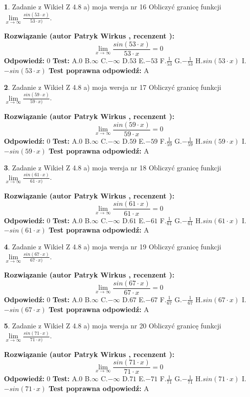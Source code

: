 \documentclass[12pt, a4paper]{article}
\theoremstyle{definition} %
\newtheorem{zad}{}
\newcommand{\zadStart}[1]{\begin{zad}#1\newline}
\newcommand{\zadStop}{\end{zad}}
\newcommand{\rozwStart}[2]{\noindent \textbf{Rozwiązanie (autor #1 , recenzent #2): }\newline}
\newcommand{\rozwStop}{\newline}
\newcommand{\odpStart}{\noindent \textbf{Odpowiedź:}\newline}
\newcommand{\odpStop}{\newline}
\newcommand{\testStart}{\noindent \textbf{Test:}\newline}
\newcommand{\testStop}{\newline}
\newcommand{\kluczStart}{\noindent \textbf{Test poprawna odpowiedź:}\newline}
\newcommand{\kluczStop}{\newline}
\begin{document}
\zadStart{Zadanie z Wikieł Z 4.8 a) moja wersja nr 16}
Obliczyć granicę funkcji $\lim\limits_{x\to \infty}\frac{sin(53\cdot x)}{53\cdot x)}$.
\zadStop
\rozwStart{Patryk Wirkus}{}
$$\lim\limits_{x\to \infty}\frac{sin(53\cdot x)}{53\cdot x}=
0$$
\rozwStop
\odpStart
$0$
\odpStop
\testStart
A.$0$ B.$\infty$ C.$-\infty$ D.$53$ E.$-53$
F.$\frac{1}{53}$ G.$-\frac{1}{53}$
H.$sin(53\cdot x)$
I.$-sin(53\cdot x)$
\testStop
\kluczStart
A
\kluczStop



\zadStart{Zadanie z Wikieł Z 4.8 a) moja wersja nr 17}
Obliczyć granicę funkcji $\lim\limits_{x\to \infty}\frac{sin(59\cdot x)}{59\cdot x)}$.
\zadStop
\rozwStart{Patryk Wirkus}{}
$$\lim\limits_{x\to \infty}\frac{sin(59\cdot x)}{59\cdot x}=
0$$
\rozwStop
\odpStart
$0$
\odpStop
\testStart
A.$0$ B.$\infty$ C.$-\infty$ D.$59$ E.$-59$
F.$\frac{1}{59}$ G.$-\frac{1}{59}$
H.$sin(59\cdot x)$
I.$-sin(59\cdot x)$
\testStop
\kluczStart
A
\kluczStop



\zadStart{Zadanie z Wikieł Z 4.8 a) moja wersja nr 18}
Obliczyć granicę funkcji $\lim\limits_{x\to \infty}\frac{sin(61\cdot x)}{61\cdot x)}$.
\zadStop
\rozwStart{Patryk Wirkus}{}
$$\lim\limits_{x\to \infty}\frac{sin(61\cdot x)}{61\cdot x}=
0$$
\rozwStop
\odpStart
$0$
\odpStop
\testStart
A.$0$ B.$\infty$ C.$-\infty$ D.$61$ E.$-61$
F.$\frac{1}{61}$ G.$-\frac{1}{61}$
H.$sin(61\cdot x)$
I.$-sin(61\cdot x)$
\testStop
\kluczStart
A
\kluczStop



\zadStart{Zadanie z Wikieł Z 4.8 a) moja wersja nr 19}
Obliczyć granicę funkcji $\lim\limits_{x\to \infty}\frac{sin(67\cdot x)}{67\cdot x)}$.
\zadStop
\rozwStart{Patryk Wirkus}{}
$$\lim\limits_{x\to \infty}\frac{sin(67\cdot x)}{67\cdot x}=
0$$
\rozwStop
\odpStart
$0$
\odpStop
\testStart
A.$0$ B.$\infty$ C.$-\infty$ D.$67$ E.$-67$
F.$\frac{1}{67}$ G.$-\frac{1}{67}$
H.$sin(67\cdot x)$
I.$-sin(67\cdot x)$
\testStop
\kluczStart
A
\kluczStop



\zadStart{Zadanie z Wikieł Z 4.8 a) moja wersja nr 20}
Obliczyć granicę funkcji $\lim\limits_{x\to \infty}\frac{sin(71\cdot x)}{71\cdot x)}$.
\zadStop
\rozwStart{Patryk Wirkus}{}
$$\lim\limits_{x\to \infty}\frac{sin(71\cdot x)}{71\cdot x}=
0$$
\rozwStop
\odpStart
$0$
\odpStop
\testStart
A.$0$ B.$\infty$ C.$-\infty$ D.$71$ E.$-71$
F.$\frac{1}{71}$ G.$-\frac{1}{71}$
H.$sin(71\cdot x)$
I.$-sin(71\cdot x)$
\testStop
\kluczStart
A
\kluczStop
\end{document}
